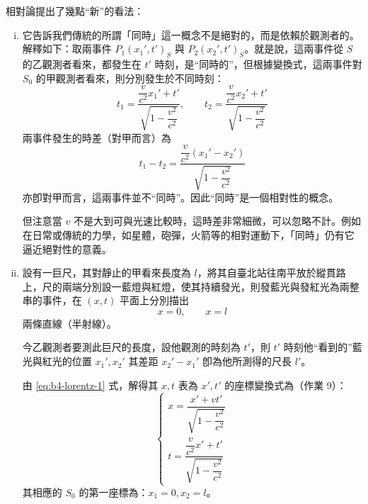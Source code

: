 相對論提出了幾點“新”的看法：
\begin{enumerate}[(i)]
  \item 它告訴我們傳統的所謂「同時」這一概念不是絕對的，而是依賴於觀測者的。解釋如下：取兩事件 $P_1(x_1', t')_S$ 與 $P_2(x_2', t')_S$。就是說，這兩事件從 $S$ 的乙觀測者看來，都發生在 $t'$ 時刻，是“同時的”，但根據變換式，這兩事件對 $S_0$ 的甲觀測者看來，則分別發生於不同時刻：
  \[ t_1 = \frac{\dfrac{v}{c^2}x_1' + t'}{\sqrt{1 - \dfrac{v^2}{c^2}}}, \qquad t_2 = \frac{\dfrac{v}{c^2}x_2' + t'}{\sqrt{1 - \dfrac{v^2}{c^2}}} \]
  兩事件發生的時差（對甲而言）為
  \[ t_1 - t_2 = \frac{\dfrac{v}{c^2}(x_1' - x_2')}{\sqrt{1 - \dfrac{v^2}{c^2}}} \]
  亦卽對甲而言，這兩事件並不“同時”。因此“同時”是一個相對性的概念。

  但注意當 $v$ 不是大到可與光速比較時，這時差非常細微，可以忽略不計。例如在日常或傳統的力學，如星體，砲彈，火箭等的相對運動下，「同時」仍有它逼近絕對性的意義。

  \item 設有一巨尺，其對靜止的甲看來長度為 $l$，將其自臺北站往南平放於縱貫路上，尺的兩端分別設一藍燈與紅燈，使其持續發光，則發藍光與發紅光為兩整串的事件，在 $(x, t)$ 平面上分別描出
  \[ x = 0, \qquad x = l \]
  兩條直線（半射線）。

  今乙觀測者要測此巨尺的長度，設他觀測的時刻為 $t'$，則 $t'$ 時刻他“看到的”藍光與紅光的位置 $x_1', x_2'$ 其差距 $x_2' - x_1'$ 卽為他所測得的尺長 $l'$。

  由 \eqref{eq:b4-lorentz-1} 式，解得其 $x, t$ 表為 $x', t'$ 的座標變換式為（作業 9）：
  \begin{equation}
  \begin{cases}
  x = \dfrac{x' + vt'}{\sqrt{1 - \dfrac{v^2}{c^2}}} \\[1.5em]
  t = \dfrac{\dfrac{v}{c^2}x' + t'}{\sqrt{1 - \dfrac{v^2}{c^2}}}
  \end{cases} \label{eq:b4-lorentz-2}
  \end{equation}
  其相應的 $S_0$ 的第一座標為：$x_1 = 0, x_2 = l$。

  \begin{figure}[H]
  \centering
\end{figure}
\end{enumerate}
